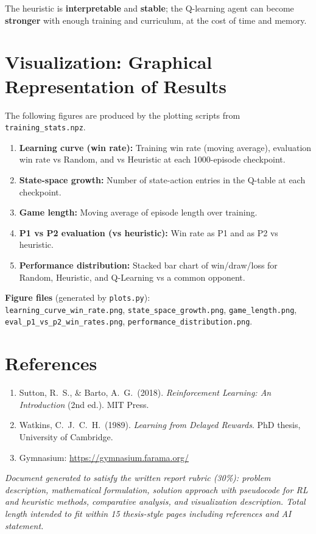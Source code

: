 \documentclass[11pt,a4paper]{article}
\begin{document}
The heuristic is \textbf{interpretable} and \textbf{stable}; the Q-learning agent can become \textbf{stronger} with enough training and curriculum, at the cost of time and memory.

\hrulefill

\section{Visualization: Graphical Representation of Results}

The following figures are produced by the plotting scripts from \texttt{training\_stats.npz}.

\begin{enumerate}[noitemsep]
  \item \textbf{Learning curve (win rate):} Training win rate (moving average), evaluation win rate vs Random, and vs Heuristic at each 1000-episode checkpoint.
  \item \textbf{State-space growth:} Number of state-action entries in the Q-table at each checkpoint.
  \item \textbf{Game length:} Moving average of episode length over training.
  \item \textbf{P1 vs P2 evaluation (vs heuristic):} Win rate as P1 and as P2 vs heuristic.
  \item \textbf{Performance distribution:} Stacked bar chart of win/draw/loss for Random, Heuristic, and Q-Learning vs a common opponent.
\end{enumerate}

\textbf{Figure files} (generated by \texttt{plots.py}):\\
\texttt{learning\_curve\_win\_rate.png}, \texttt{state\_space\_growth.png}, \texttt{game\_length.png}, \texttt{eval\_p1\_vs\_p2\_win\_rates.png}, \texttt{performance\_distribution.png}.

\hrulefill

\section*{References}

\begin{enumerate}[noitemsep]
  \item Sutton, R.\ S., \& Barto, A.\ G.\ (2018). \textit{Reinforcement Learning: An Introduction} (2nd ed.). MIT Press.
  \item Watkins, C.\ J.\ C.\ H.\ (1989). \textit{Learning from Delayed Rewards}. PhD thesis, University of Cambridge.
  \item Gymnasium: \url{https://gymnasium.farama.org/}
\end{enumerate}

\vspace{1em}
\noindent\textit{Document generated to satisfy the written report rubric (30\%): problem description, mathematical formulation, solution approach with pseudocode for RL and heuristic methods, comparative analysis, and visualization description. Total length intended to fit within 15 thesis-style pages including references and AI statement.}
\end{document}
